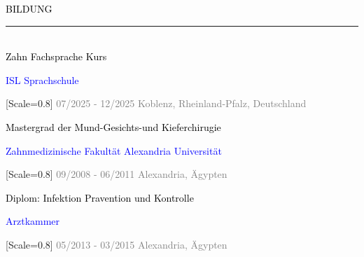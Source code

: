 {\setmainfont{Rubik Medium}\fontsize{11}{14}\selectfont\textcolor{black}{BILDUNG}}
\\[-4pt]
\textcolor{black}{\rule{\textwidth}{2pt}}\\[-4pt]

{\setmainfont{Rubik Medium}\fontsize{10}{14}\selectfont\textcolor{black}{Zahn Fachsprache Kurs}}

{\setmainfont{Rubik Medium}\fontsize{10}{14}\selectfont\textcolor{blue}{ISL Sprachschule}}

{[Scale=0.8]
\textcolor{gray}{
\faCalendar\hspace{4pt}07/2025 - 12/2025\hspace{1.5em}
\faMapMarker*\hspace{4pt}Koblenz, Rheinland-Pfalz, Deutschland
}}\\[-15pt]



\vspace{0.7em}

{\setmainfont{Rubik Medium}\fontsize{10}{14}\selectfont\textcolor{black}{Mastergrad der Mund-Gesichts-und Kieferchirugie}}

{\setmainfont{Rubik Medium}\fontsize{10}{14}\selectfont\textcolor{blue}{Zahnmedizinische Fakultät Alexandria Universität}}

{[Scale=0.8]
\textcolor{gray}{
\faCalendar\hspace{4pt}09/2008 - 06/2011\hspace{1.5em}
\faMapMarker*\hspace{4pt}Alexandria, Ägypten
}}\\[-15pt]



\vspace{0.7em}

{\setmainfont{Rubik Medium}\fontsize{10}{14}\selectfont\textcolor{black}{Diplom: Infektion Pravention und Kontrolle}}

{\setmainfont{Rubik Medium}\fontsize{10}{14}\selectfont\textcolor{blue}{Arztkammer}}

{[Scale=0.8]
\textcolor{gray}{
\faCalendar\hspace{4pt}05/2013 - 03/2015\hspace{1.5em}
\faMapMarker*\hspace{4pt}Alexandria, Ägypten
}}\\[-15pt]



